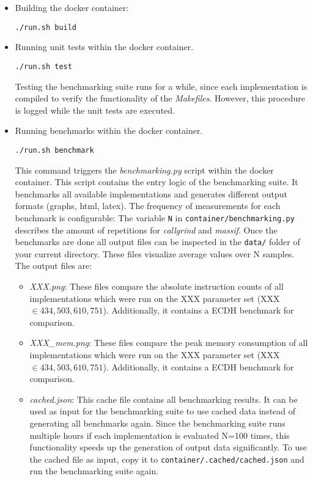 \begin{itemize}
\itemsep0em 
\item Building the docker container:
\begin{lstlisting}[numbers=none,linewidth=4cm]
./run.sh build
\end{lstlisting}

\item Running unit tests within the docker container.
\begin{lstlisting}[numbers=none,linewidth=4cm]
./run.sh test
\end{lstlisting}
Testing the benchmarking suite runs for a while, since each implementation is compiled to verify the functionality of the \textit{Makefiles}. However, this procedure is logged while the unit tests are executed.

\item Running benchmarks within the docker container.
\begin{lstlisting}[numbers=none,linewidth=4cm]
./run.sh benchmark
\end{lstlisting}
This command triggers the \textit{benchmarking.py} script within the docker container. This script contains the entry logic of the benchmarking suite. It benchmarks all available implementations and generates different output formats (graphs, html, latex). The frequency of measurements for each benchmark is configurable: The variable \texttt{N} in \texttt{container/benchmarking.py} describes the amount of repetitions for \textit{callgrind} and \textit{massif}. Once the benchmarks are done all output files can be inspected in the  \texttt{data/} folder of your current directory. These files visualize average values over N samples. The output files are:
	\begin{itemize}
	\item \textit{XXX.png}: These files compare the absolute instruction counts of all implementations which were run on the XXX parameter set (XXX $\in {434, 503, 610, 751}$). Additionally, it contains a ECDH benchmark for comparison.
	\item \textit{XXX\_mem.png}: These files compare the peak memory consumption of all implementations which were run on the XXX parameter set (XXX $\in {434, 503, 610, 751}$). Additionally, it contains a ECDH benchmark for comparison.

	\item \textit{cached.json}: This cache file contains all benchmarking results. It can be used as input for the benchmarking suite to use cached data instead of generating all benchmarks again. Since the benchmarking suite runs multiple hours if each implementation is evaluated N=100 times, this functionality speeds up the generation of output data significantly. To use the cached file as input, copy it to \texttt{container/.cached/cached.json} and run the benchmarking suite again.
	

\end{itemize}
\end{itemize}
